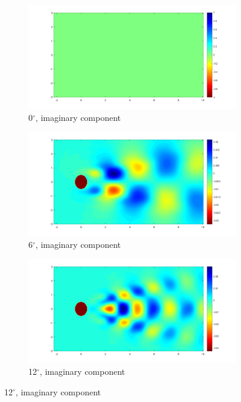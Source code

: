 \documentclass[letterpaper,12pt,peerreviewca,draftcls]{IEEEtran}
\begin{document}
\begin{figure}[h]
\begin{subfigure}[t]{0.30\textwidth}
	\end{subfigure}	
	\begin{subfigure}[t]{0.30\textwidth}
		\includegraphics[width=\linewidth]{"Figure 16d"}
		\caption{0$^\circ$, imaginary component}
	\end{subfigure}	
	\begin{subfigure}[t]{0.30\textwidth}
		\includegraphics[width=\linewidth]{"Figure 16e"}
		\caption{6$^\circ$, imaginary component}
	\end{subfigure}
	\begin{subfigure}[t]{0.30\textwidth}
		\includegraphics[width=\linewidth]{"Figure 16f"}
		\caption{12$^\circ$, imaginary component}

\end{subfigure}
\end{figure}
\end{document}
